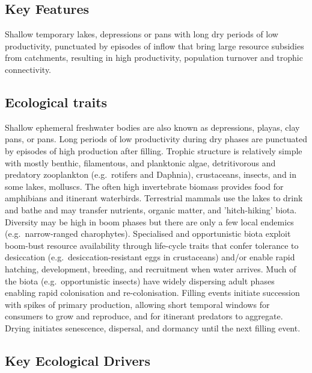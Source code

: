\documentclass[
  letterpaper,
  DIV=11,
  numbers=noendperiod]{scrartcl}
\begin{document}
\subsection{Key Features}\label{key-features-121}

Shallow temporary lakes, depressions or pans with long dry periods of
low productivity, punctuated by episodes of inflow that bring large
resource subsidies from catchments, resulting in high productivity,
population turnover and trophic connectivity.

\subsection{Ecological traits}\label{ecological-traits-121}

Shallow ephemeral freshwater bodies are also known as depressions,
playas, clay pans, or pans. Long periods of low productivity during dry
phases are punctuated by episodes of high production after filling.
Trophic structure is relatively simple with mostly benthic, filamentous,
and planktonic algae, detritivorous and predatory zooplankton
(e.g.~rotifers and Daphnia), crustaceans, insects, and in some lakes,
molluscs. The often high invertebrate biomass provides food for
amphibians and itinerant waterbirds. Terrestrial mammals use the lakes
to drink and bathe and may transfer nutrients, organic matter, and
'hitch-hiking' biota. Diversity may be high in boom phases but there are
only a few local endemics (e.g.~narrow-ranged charophytes). Specialised
and opportunistic biota exploit boom-bust resource availability through
life-cycle traits that confer tolerance to desiccation
(e.g.~desiccation-resistant eggs in crustaceans) and/or enable rapid
hatching, development, breeding, and recruitment when water arrives.
Much of the biota (e.g.~opportunistic insects) have widely dispersing
adult phases enabling rapid colonisation and re-colonisation. Filling
events initiate succession with spikes of primary production, allowing
short temporal windows for consumers to grow and reproduce, and for
itinerant predators to aggregate. Drying initiates senescence,
dispersal, and dormancy until the next filling event.

\subsection{Key Ecological Drivers}\label{key-ecological-drivers-121}
\end{document}
